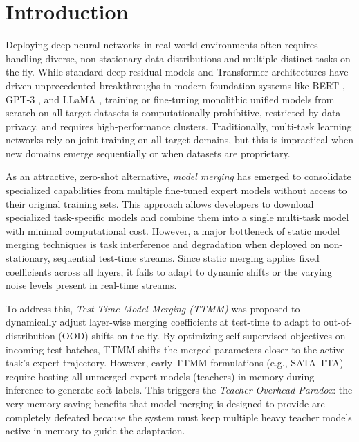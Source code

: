 \documentclass{article}
\theoremstyle{plain}
\theoremstyle{definition}
\theoremstyle{remark}
\begin{document}
\section{Introduction}
\label{sec:intro}
Deploying deep neural networks in real-world environments often requires handling diverse, non-stationary data distributions and multiple distinct tasks on-the-fly. While standard deep residual models \cite{he2016deep} and Transformer architectures \cite{vaswani2017attention} have driven unprecedented breakthroughs in modern foundation systems like BERT \cite{devlin2018bert}, GPT-3 \cite{brown2020language}, and LLaMA \cite{touvron2023llama}, training or fine-tuning monolithic unified models from scratch on all target datasets is computationally prohibitive, restricted by data privacy, and requires high-performance clusters. Traditionally, multi-task learning networks rely on joint training on all target domains, but this is impractical when new domains emerge sequentially or when datasets are proprietary.

As an attractive, zero-shot alternative, \emph{model merging} \cite{wortsman2022model, ilharco2022editing} has emerged to consolidate specialized capabilities from multiple fine-tuned expert models without access to their original training sets. This approach allows developers to download specialized task-specific models and combine them into a single multi-task model with minimal computational cost. However, a major bottleneck of static model merging techniques is task interference and degradation when deployed on non-stationary, sequential test-time streams. Since static merging applies fixed coefficients across all layers, it fails to adapt to dynamic shifts or the varying noise levels present in real-time streams.

To address this, \emph{Test-Time Model Merging (TTMM)} \cite{sata2026convex, ewc2026tta} was proposed to dynamically adjust layer-wise merging coefficients at test-time to adapt to out-of-distribution (OOD) shifts on-the-fly. By optimizing self-supervised objectives on incoming test batches, TTMM shifts the merged parameters closer to the active task's expert trajectory. However, early TTMM formulations (e.g., SATA-TTA) require hosting all unmerged expert models (teachers) in memory during inference to generate soft labels. This triggers the \emph{Teacher-Overhead Paradox}: the very memory-saving benefits that model merging is designed to provide are completely defeated because the system must keep multiple heavy teacher models active in memory to guide the adaptation.
\end{document}
